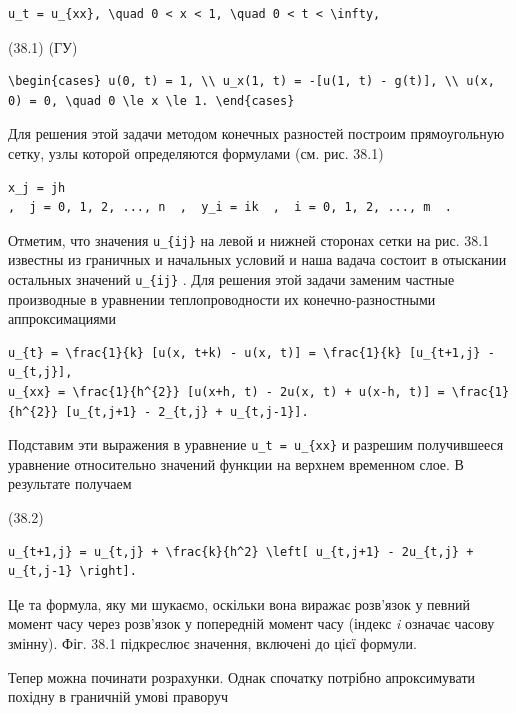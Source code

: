 \documentclass[
  ukrainian,
]{article}
\begin{document}
\begin{verbatim}
u_t = u_{xx}, \quad 0 < x < 1, \quad 0 < t < \infty,
\end{verbatim}

(38.1) (ГУ)

\begin{verbatim}
\begin{cases} u(0, t) = 1, \\ u_x(1, t) = -[u(1, t) - g(t)], \\ u(x, 0) = 0, \quad 0 \le x \le 1. \end{cases}
\end{verbatim}

Для решения этой задачи методом конечных разностей построим
прямоугольную сетку, узлы которой определяются формулами (см. рис. 38.1)

\begin{verbatim}
x_j = jh
,  j = 0, 1, 2, ..., n  ,  y_i = ik  ,  i = 0, 1, 2, ..., m  .
\end{verbatim}

Отметим, что значения \texttt{u\_\{ij\}} на левой и нижней сторонах
сетки на рис. 38.1 известны из граничных и начальных условий и наша
вадача состоит в отыскании остальных значений \texttt{u\_\{ij\}} . Для
решения этой задачи заменим частные производные в уравнении
теплопроводности их конечно-разностными аппроксимациями

\begin{verbatim}
u_{t} = \frac{1}{k} [u(x, t+k) - u(x, t)] = \frac{1}{k} [u_{t+1,j} - u_{t,j}],
u_{xx} = \frac{1}{h^{2}} [u(x+h, t) - 2u(x, t) + u(x-h, t)] = \frac{1}{h^{2}} [u_{t,j+1} - 2_{t,j} + u_{t,j-1}].
\end{verbatim}

Подставим эти выражения в уравнение \texttt{u\_t\ =\ u\_\{xx\}} и
разрешим получившееся уравнение относительно значений функции на верхнем
временном слое. В результате получаем

(38.2)

\begin{verbatim}
u_{t+1,j} = u_{t,j} + \frac{k}{h^2} \left[ u_{t,j+1} - 2u_{t,j} + u_{t,j-1} \right].
\end{verbatim}

Це та формула, яку ми шукаємо, оскільки вона виражає розв'язок у певний
момент часу через розв'язок у попередній момент часу (індекс \emph{i}
означає часову змінну). Фіг. 38.1 підкреслює значення, включені до цієї
формули.

Тепер можна починати розрахунки. Однак спочатку потрібно апроксимувати
похідну в граничній умові праворуч
\end{document}
